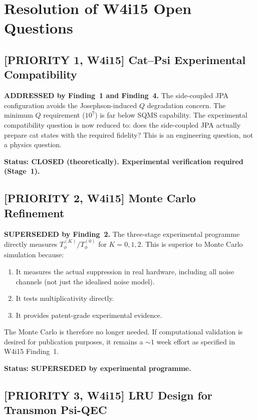 \documentclass[11pt]{article}
\theoremstyle{definition}
\theoremstyle{remark}
\begin{document}
\section{Resolution of W4i15 Open Questions}
\label{sec:open-resolution}

\subsection{[PRIORITY 1, W4i15] Cat--Psi Experimental Compatibility}

\textbf{ADDRESSED by Finding~1 and Finding~4.}  The side-coupled JPA
configuration avoids the Josephson-induced $Q$ degradation concern.
The minimum $Q$ requirement ($10^7$) is far below SQMS capability.
The experimental compatibility question is now reduced to: does the
side-coupled JPA actually prepare cat states with the required fidelity?
This is an engineering question, not a physics question.

\textbf{Status: CLOSED (theoretically).  Experimental verification
required (Stage~1).}

\subsection{[PRIORITY 2, W4i15] Monte Carlo Refinement}

\textbf{SUPERSEDED by Finding~2.}  The three-stage experimental
programme directly measures $T_\phi^{(K)}/T_\phi^{(0)}$ for $K = 0,
1, 2$.  This is superior to Monte Carlo simulation because:
\begin{enumerate}[nosep]
  \item It measures the actual suppression in real hardware, including
    all noise channels (not just the idealised noise model).
  \item It tests multiplicativity directly.
  \item It provides patent-grade experimental evidence.
\end{enumerate}

The Monte Carlo is therefore no longer needed.  If computational
validation is desired for publication purposes, it remains a $\sim 1$
week effort as specified in W4i15 Finding~1.

\textbf{Status: SUPERSEDED by experimental programme.}

\subsection{[PRIORITY 3, W4i15] LRU Design for Transmon Psi-QEC}
\end{document}
